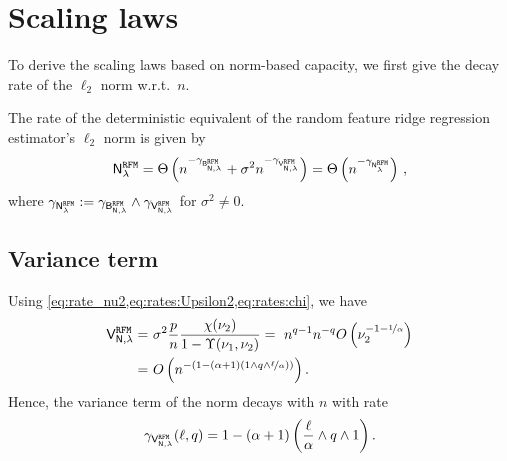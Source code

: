 \section{Scaling laws}
\label{app:scaling_law}
To derive the scaling laws based on norm-based capacity, we first give the decay rate of the $\ell_2$ norm w.r.t.\ \(n\).

The rate of the deterministic equivalent of the random feature ridge regression estimator's $\ell_2$ norm  is given by
\[
\mathsf N_\lambda^{\tt RFM} = \Theta\left(n^{-\gamma_{\mathsf B_{\mathsf N,\lambda}^{\tt RFM}}}+\sigma^2n^{-\gamma_{\mathsf V_{\mathsf N,\lambda}^{\tt RFM}}}\right) = \Theta\left(n^{-\gamma_{\mathsf N_\lambda^{\tt RFM}}}\right)\,,
\]
where $\gamma_{\mathsf N_\lambda^{\tt RFM}} := \gamma_{\mathsf B_{\mathsf N,\lambda}^{\tt RFM}} \wedge \gamma_{\mathsf V_{\mathsf N,\lambda}^{\tt RFM}}$ for $\sigma^2 \neq 0$.
    
\subsection{Variance term}
Using \cref{eq:rate_nu2,eq:rates:Upsilon2,eq:rates:chi}, we have
\[
\begin{aligned}
\mathsf V_{\mathsf N,\lambda}^{\tt RFM} =&~ \sigma^2 \frac{p}{n} \frac{\chi(\nu_2)}{1 - \Upsilon(\nu_1, \nu_2)} =~ n^{q-1}n^{-q}O\left(\nu_2^{-1-\nicefrac{1}{\alpha}}\right)\\
=&~O\left(n^{-\left(1- \left(\alpha+1\right)\left(1 \wedge q \wedge \nicefrac{\ell}{\alpha}\right)\right)}\right).
\end{aligned}
\]
Hence, the variance term of the norm decays with $n$ with rate
\[
\gamma_{\mathsf V_{\mathsf N,\lambda}^{\tt RFM}}(\ell, q) = 1 - \left(\alpha+1\right)\left(\frac{\ell}{\alpha}\wedge q\wedge 1\right). 
\]

